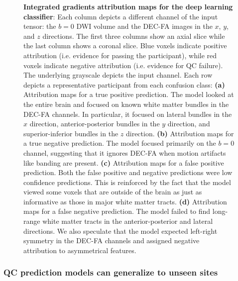 \documentclass[fleqn,10pt,inline]{wlscirep}
\begin{document}
\begin{figure}[tbp]
\begin{subfigure}{\dimexpr\linewidth-3.5em\relax}
    \end{subfigure}
    \caption{%
        {\bf Integrated gradients attribution maps for the deep learning classifier}:
        Each column depicts a different channel of the input tensor: the $b=0$
        DWI volume and the DEC-FA images in the $x$, $y$, and $z$ directions.
        The first three columns show an axial slice while the last column
        shows a coronal slice. Blue voxels indicate positive attribution (i.e.
        evidence for passing the participant), while red voxels indicate negative
        attribution (i.e. evidence for QC failure). The underlying grayscale
        depicts the input channel. Each row depicts a representative participant
        from each confusion class:
        \textbf{(a)} Attribution maps for a true positive prediction. The model
        looked at the entire brain and focused on known white matter bundles in
        the DEC-FA channels. In particular, it focused on lateral bundles in the
        $x$ direction, anterior-posterior bundles in the $y$ direction, and
        superior-inferior bundles in the $z$ direction.
        \textbf{(b)} Attribution maps for a true negative prediction. The model
        focused primarily on the $b=0$ channel, suggesting that it ignores
        DEC-FA when motion artifacts like banding are present.
        \textbf{(c)} Attribution maps for a false positive prediction. Both the
        false positive and negative predictions were low confidence predictions.
        This is reinforced by the fact that the model viewed some voxels that are outside of the brain as just as informative as those in major white
        matter tracts.
        \textbf{(d)} Attribution maps for a false negative prediction. The model
        failed to find long-range white matter tracts in the anterior-posterior
        and lateral directions. We also speculate that the model expected
        left-right symmetry in the DEC-FA channels and assigned negative
        attribution to asymmetrical features. }
    \label{fig:ig}
\end{figure}

\subsubsection*{QC prediction models can generalize to unseen sites}
\end{document}
